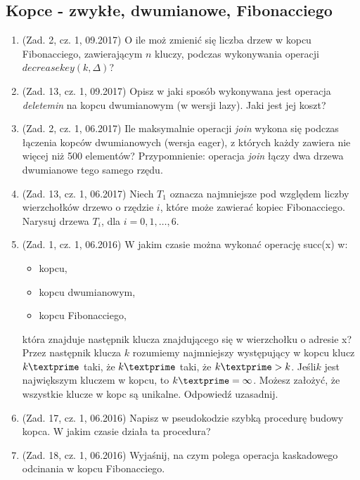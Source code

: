 \documentclass[10pt]{article}%
\begin{document}
\subsection{Kopce - zwykłe, dwumianowe, Fibonacciego}

\begin{enumerate}

\item (Zad. 2, cz. 1, 09.2017) O ile moż zmienić się liczba drzew w kopcu Fibonacciego, zawierającym $n$ kluczy, podczas wykonywania operacji $decreasekey(k,\Delta)$?

\item (Zad. 13, cz. 1, 09.2017) Opisz w jaki sposób wykonywana jest operacja \textit{deletemin} na kopcu dwumianowym (w wersji lazy). Jaki jest jej koszt?

\item (Zad. 2, cz. 1, 06.2017) Ile maksymalnie operacji \textit{join} wykona się podczas łączenia kopców dwumianowych (wersja eager), z których każdy zawiera nie więcej niż 500 elementów? Przypomnienie: operacja \textit{join} łączy dwa drzewa dwumianowe tego samego rzędu.

\item (Zad. 13, cz. 1, 06.2017) Niech $T_{1}$ oznacza najmniejsze pod względem liczby wierzchołków drzewo o rzędzie $i$, które może zawierać kopiec Fibonacciego. Narysuj drzewa $T_{i}$, dla $i = 0,1,\ldots,6$.

\item (Zad. 1, cz. 1, 06.2016) W jakim czasie można wykonać operację succ(x) w:
\begin{itemize}
\item kopcu,
\item kopcu dwumianowym,
\item kopcu Fibonacciego,
\end{itemize}
która znajduje następnik klucza znajdującego się w wierzchołku o adresie x? Przez następnik klucza $k$ rozumiemy najmniejszy występujący w kopcu klucz $k\textprime$ taki, że $k\textprime$ taki, że $ k\textprime > k$. Jeśli$k$ jest największym kluczem w kopcu, to $k\textprime = \infty$. Możesz założyć, że wszystkie klucze w kopc są unikalne. Odpowiedź uzasadnij.
\item (Zad. 17, cz. 1, 06.2016) Napisz w pseudokodzie szybką procedurę budowy kopca. W jakim czasie działa ta procedura?

\item (Zad. 18, cz. 1, 06.2016) Wyjaśnij, na czym polega operacja kaskadowego odcinania w kopcu Fibonacciego.


\end{enumerate}
\end{document}
